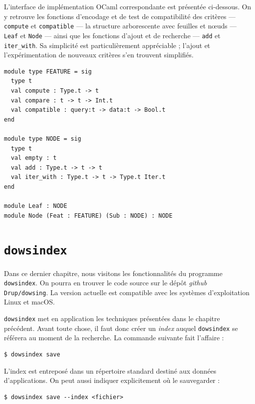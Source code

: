 \documentclass[a4paper]{report}
\theoremstyle{definition}
\newcommand{\dowsindex}{\texttt{dowsindex}\xspace}
\begin{document}
L'interface de implémentation OCaml correspondante est présentée ci-dessous. On y retrouve les fonctions d'encodage et de test de compatibilité des critères — \texttt{compute} et \texttt{compatible} — la structure arborescente avec feuilles et nœuds — \texttt{Leaf} et \texttt{Node} — ainsi que les fonctions d'ajout et de recherche — \texttt{add} et \texttt{iter_with}. Sa simplicité est particulièrement appréciable ; l'ajout et l'expérimentation de nouveaux critères s'en trouvent simplifiés.

\begin{verbatim}
module type FEATURE = sig
  type t
  val compute : Type.t -> t
  val compare : t -> t -> Int.t
  val compatible : query:t -> data:t -> Bool.t
end

module type NODE = sig
  type t
  val empty : t
  val add : Type.t -> t -> t
  val iter_with : Type.t -> t -> Type.t Iter.t
end

module Leaf : NODE
module Node (Feat : FEATURE) (Sub : NODE) : NODE
\end{verbatim}


\chapter{\dowsindex}

Dans ce dernier chapitre, nous visitons les fonctionnalités du programme \dowsindex. On pourra en trouver le code source sur le dépôt \textit{github} \texttt{Drup/dowsing}. La version actuelle est compatible avec les systèmes d'exploitation Linux et macOS.

\dowsindex met en application les techniques présentées dans le chapitre précédent. Avant toute chose, il faut donc créer un \emph{index} auquel \dowsindex se référera au moment de la recherche. La commande suivante fait l'affaire :

\begin{verbatim}
$ dowsindex save
\end{verbatim}

L'index est entreposé dans un répertoire standard destiné aux données d'applications. On peut aussi indiquer explicitement où le sauvegarder :

\begin{verbatim}
$ dowsindex save --index <fichier>
\end{verbatim}
\end{document}
